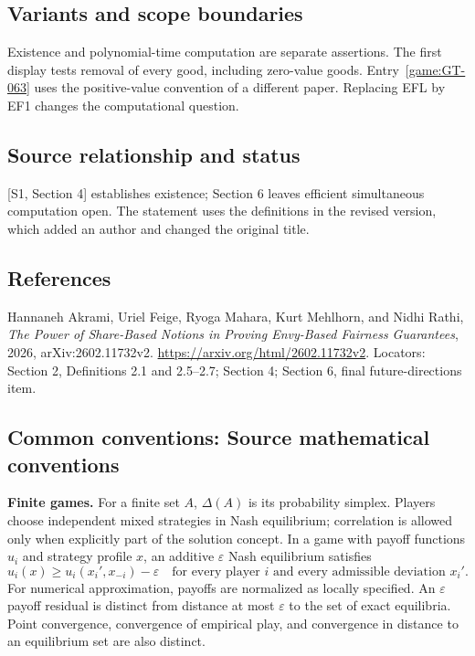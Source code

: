 \documentclass[11pt,a4paper]{article}
\begin{document}
\subsection*{Variants and scope boundaries}
Existence and polynomial-time computation are separate assertions.
The first display tests removal of every good, including zero-value goods.
Entry~\ref{game:GT-063} uses the positive-value convention of a different paper.
Replacing EFL by EF1 changes the computational question.

\subsection*{Source relationship and status}
[S1, Section 4] establishes existence; Section 6 leaves efficient
simultaneous computation open. The statement uses the definitions in the
revised version, which added an author and changed the original title.

\subsection*{References}
\begingroup\footnotesize\raggedright
\noindent[S1] Hannaneh Akrami, Uriel Feige, Ryoga Mahara, Kurt Mehlhorn,
and Nidhi Rathi,
\emph{The Power of Share-Based Notions in Proving Envy-Based Fairness
Guarantees}, 2026, arXiv:2602.11732v2.
\url{https://arxiv.org/html/2602.11732v2}.
Locators: Section 2, Definitions 2.1 and 2.5--2.7;
Section 4; Section 6, final future-directions item.
\par\endgroup

\subsection*{Common conventions: Source mathematical conventions}

\textbf{Finite games.} For a finite set $A$, $\Delta(A)$ is its probability
simplex. Players choose independent mixed strategies in Nash equilibrium;
correlation is allowed only when explicitly part of the solution concept.
In a game with payoff functions $u_i$ and strategy profile $x$, an additive
$\varepsilon$ Nash equilibrium satisfies
\[
 u_i(x)\geq u_i(x_i',x_{-i})-\varepsilon
 \quad\text{for every player $i$ and every admissible deviation $x_i'$}.
\]
For numerical approximation, payoffs are normalized as locally specified.
An $\varepsilon$ payoff residual is distinct from distance at most
$\varepsilon$ to the set of exact equilibria. Point convergence, convergence
of empirical play, and convergence in distance to an equilibrium set are
also distinct.
\end{document}
